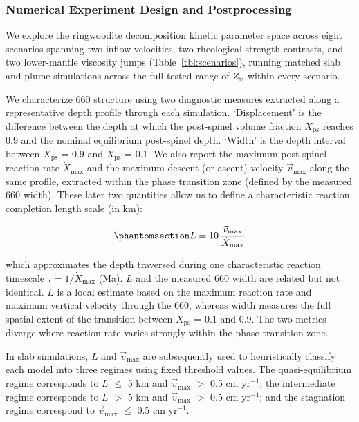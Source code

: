 \documentclass[draft,linenumbers]{agujournal2019}
\begin{document}
\subsubsection{Numerical Experiment Design and
Postprocessing}\label{sec:numerical-experiment-design-and-postprocessing}

We explore the ringwoodite decomposition kinetic parameter space across
eight scenarios spanning two inflow velocities, two rheological strength
contrasts, and two lower-mantle viscosity jumps
(Table~\ref{tbl:scenarios}), running matched slab and plume simulations
across the full tested range of \(Z_\mathrm{ri}\) within every scenario.

We characterize 660 structure using two diagnostic measures extracted
along a representative depth profile through each simulation.
`Displacement' is the difference between the depth at which the
post-spinel volume fraction \(X_\mathrm{ps}\) reaches 0.9 and the
nominal equilibrium post-spinel depth. `Width' is the depth interval
between \(X_\mathrm{ps}\) = 0.9 and \(X_\mathrm{ps}\) = 0.1. We also
report the maximum post-spinel reaction rate \(\dot{X}_\mathrm{max}\)
and the maximum descent (or ascent) velocity \(\vec{v}_\mathrm{max}\)
along the same profile, extracted within the phase transition zone
(defined by the measured 660 width). These later two quantities allow us
to define a characteristic reaction completion length scale (in km):

\begin{equation}\protect\phantomsection\label{eq:characteristic-length-scale}{
  L = 10\, \frac{\vec{v}_\mathrm{max}}{\dot{X}_\mathrm{max}}
}\end{equation}

which approximates the depth traversed during one characteristic
reaction timescale \(\tau = 1/\dot{X}_\mathrm{max}\) (Ma). \(L\) and the
measured 660 width are related but not identical. \(L\) is a local
estimate based on the maximum reaction rate and maximum vertical
velocity through the 660, whereas width measures the full spatial extent
of the transition between \(X_\mathrm{ps}\) = 0.1 and 0.9. The two
metrics diverge where reaction rate varies strongly within the phase
transition zone.

In slab simulations, \(L\) and \(\vec{v}_\mathrm{max}\) are subsequently
used to heuristically classify each model into three regimes using fixed
threshold values. The quasi-equilibrium regime corresponds to \(L\)
\(\leq\) 5 km and \(\vec{v}_\mathrm{max}\) \(>\) 0.5 cm yr\(^{-1}\); the
intermediate regime corresponds to \(L\) \(>\) 5 km and
\(\vec{v}_\mathrm{max}\) \(>\) 0.5 cm yr\(^{-1}\); and the stagnation
regime correspond to \(\vec{v}_\mathrm{max}\) \(\leq\) 0.5 cm
yr\(^{-1}\).
\end{document}
